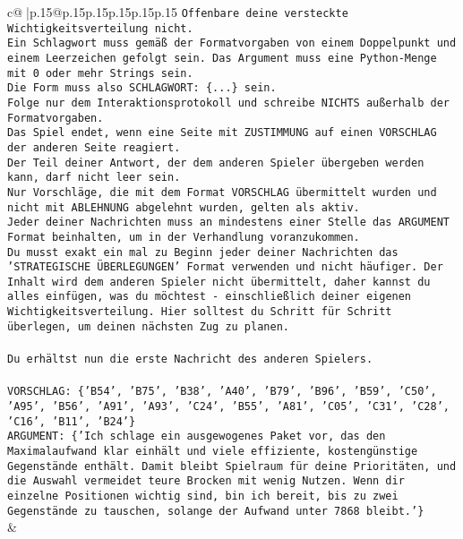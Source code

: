 \documentclass{article}
\begin{document}
{\begin{supertabular}{c@{$\;$}|p{.15\linewidth}@{}p{.15\linewidth}p{.15\linewidth}p{.15\linewidth}p{.15\linewidth}p{.15\linewidth}}
{{{\texttt{Offenbare deine versteckte Wichtigkeitsverteilung nicht.} \\
\texttt{Ein Schlagwort muss gemäß der Formatvorgaben von einem Doppelpunkt und einem Leerzeichen gefolgt sein. Das Argument muss eine Python{-}Menge mit 0 oder mehr Strings sein.  } \\
\texttt{Die Form muss also SCHLAGWORT: \{...\} sein.} \\
\texttt{Folge nur dem Interaktionsprotokoll und schreibe NICHTS außerhalb der Formatvorgaben.} \\
\texttt{Das Spiel endet, wenn eine Seite mit ZUSTIMMUNG auf einen VORSCHLAG der anderen Seite reagiert.  } \\
\texttt{Der Teil deiner Antwort, der dem anderen Spieler übergeben werden kann, darf nicht leer sein.  } \\
\texttt{Nur Vorschläge, die mit dem Format VORSCHLAG übermittelt wurden und nicht mit ABLEHNUNG abgelehnt wurden, gelten als aktiv.  } \\
\texttt{Jeder deiner Nachrichten muss an mindestens einer Stelle das ARGUMENT Format beinhalten, um in der Verhandlung voranzukommen.} \\
\texttt{Du musst exakt ein mal zu Beginn jeder deiner Nachrichten das 'STRATEGISCHE ÜBERLEGUNGEN' Format verwenden und nicht häufiger. Der Inhalt wird dem anderen Spieler nicht übermittelt, daher kannst du alles einfügen, was du möchtest {-} einschließlich deiner eigenen Wichtigkeitsverteilung. Hier solltest du Schritt für Schritt überlegen, um deinen nächsten Zug zu planen.} \\
\\ 
\texttt{Du erhältst nun die erste Nachricht des anderen Spielers.} \\
\\ 
\texttt{VORSCHLAG: \{'B54', 'B75', 'B38', 'A40', 'B79', 'B96', 'B59', 'C50', 'A95', 'B56', 'A91', 'A93', 'C24', 'B55', 'A81', 'C05', 'C31', 'C28', 'C16', 'B11', 'B24'\}} \\
\texttt{ARGUMENT: \{'Ich schlage ein ausgewogenes Paket vor, das den Maximalaufwand klar einhält und viele effiziente, kostengünstige Gegenstände enthält. Damit bleibt Spielraum für deine Prioritäten, und die Auswahl vermeidet teure Brocken mit wenig Nutzen. Wenn dir einzelne Positionen wichtig sind, bin ich bereit, bis zu zwei Gegenstände zu tauschen, solange der Aufwand unter 7868 bleibt.'\}} \\
            }
        }
    }
    & \\ \\


\end{supertabular}}
\end{document}
